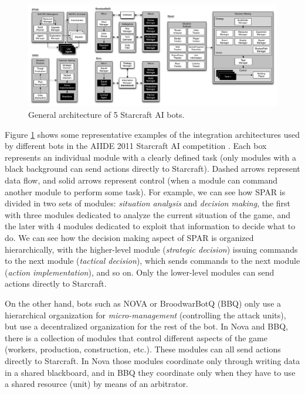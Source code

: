 \documentclass[journal]{IEEEtran}
\begin{document}
\begin{figure}[ta]
    \centering
    \includegraphics[width=\textwidth]{figures/figure-bot-architectures-wide.pdf}
    \caption{General architecture of 5 Starcraft AI bots.}
    \label{fig:bot-architecture}
\end{figure}

Figure \ref{fig:bot-architecture} shows some representative examples of the integration architectures used by different bots in the AIIDE 2011 Starcraft AI competition \cite{???}. Each box represents an individual module with a clearly defined task (only modules with a black background can send actions directly to Starcraft). Dashed arrows represent data flow, and solid arrows represent control (when a module can command another module to perform some task). For example, we can see how SPAR is divided in two sets of modules: {\em situation analysis} and {\em decision making}, the first with three modules dedicated to analyze the current situation of the game, and the later with 4 modules dedicated to exploit that information to decide what to do. We can see how the decision making aspect of SPAR is organized hierarchically, with the higher-level module ({\em strategic decision}) issuing commands to the next module ({\em tactical decision}), which sends commands to the next module ({\em action implementation}), and so on. Only the lower-level modules can send actions directly to Starcraft. 

On the other hand, bots such as NOVA or BroodwarBotQ (BBQ) only use a hierarchical organization for {\em micro-management} (controlling the attack units), but use a decentralized organization for the rest of the bot. In Nova and BBQ, there is a collection of modules that control different aspects of the game (workers, production, construction, etc.). These modules can all send actions directly to Starcraft. In Nova those modules coordinate only through writing data in a shared blackboard, and in BBQ they coordinate only when they have to use a shared resource (unit) by means of an arbitrator.
\end{document}
